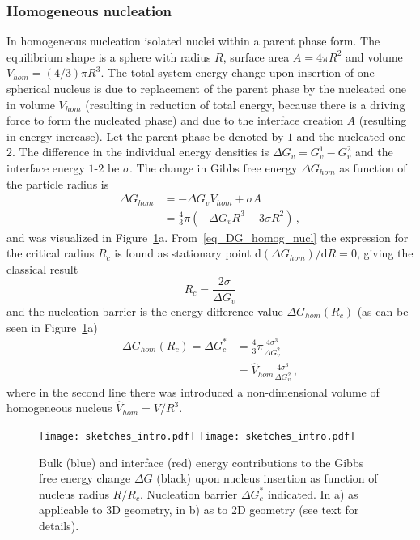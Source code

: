         \subsubsection{Homogeneous nucleation}
        In homogeneous nucleation isolated nuclei within a parent phase form. The equilibrium shape is a sphere with radius $R$, surface area $A=4\pi R^2$ and volume $V_{hom}=(4/3)\pi R^3$. The total system energy change upon insertion of one spherical nucleus is due to replacement of the parent phase by the nucleated one in volume $V_{hom}$ (resulting in reduction of total energy, because there is a driving force to form the nucleated phase) and due to the interface creation $A$ (resulting in energy increase). Let the parent phase be denoted by $\mathit{1}$ and the nucleated one $\mathit{2}$. The difference in the individual energy densities is $\Delta G_v=G_v^\mathit{1}-G_v^\mathit{2}$ and the interface energy $\mathit{1}$-$\mathit{2}$ be $\sigma$.  The change in Gibbs free energy $\Delta G_{hom}$ as function of the particle radius is
        \begin{align}
            \Delta G_{hom} &= -\Delta G_v V_{hom} + \sigma A  \\
                &= \frac{4}{3}\pi(-\Delta G_v R^3 + 3\sigma R^2)\,, \label{eq_DG_homog_nucl}
        \end{align}
        and was visualized in Figure~\ref{fig_nucl_barrier}a. From~\eqref{eq_DG_homog_nucl} the expression for the critical radius $R_c$ is found as stationary point $\mathrm{d}(\Delta G_{hom})/\mathrm{d}R=0$, giving the classical result
        \begin{equation} \label{eq_crit_radius}
            R_c = \frac{2\sigma}{\Delta G_v}
        \end{equation}
        and the nucleation barrier is the energy difference value $\Delta G_{hom}(R_c)$ (as can be seen in Figure~\ref{fig_nucl_barrier}a)
        \begin{align}
            \Delta G_{hom}(R_c) = \Delta G_c^* &= \frac{4}{3}\pi\frac{4\sigma^3}{\Delta G_v^2}    \\
                &= \hat{V}_{hom}\frac{4\sigma^3}{\Delta G_v^2} \,,\label{eq_crit_nucl_barrier_hom_iso}
        \end{align}
        where in the second line there was introduced a non-dimensional volume of homogeneous nucleus $\hat{V}_{hom}=V/R^3$.
        
        \begin{figure}
            \centering
            \texttt{[image: sketches\_intro.pdf]}
            \texttt{[image: sketches\_intro.pdf]}
            \caption[Gibbs free energy change upon a particle insertion according to CNT]{Bulk (blue) and interface (red) energy contributions to the Gibbs free energy change $\Delta G$ (black) upon nucleus insertion as function of nucleus radius $R/R_c$. Nucleation barrier $\Delta G_c^*$ indicated. In a) as applicable to 3D geometry, in b) as to 2D geometry (see text for details).}
            \label{fig_nucl_barrier}
        \end{figure}
        
